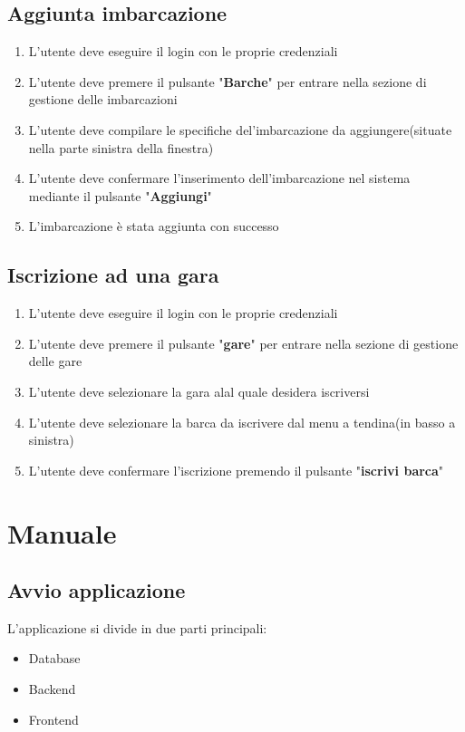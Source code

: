 \documentclass{report}
\begin{document}
    \section{Aggiunta imbarcazione}
    \begin{enumerate}
      \item L'utente deve eseguire il login con le proprie credenziali
      \item L'utente deve premere il pulsante "\textbf{Barche}" per entrare nella sezione di gestione delle imbarcazioni
      \item L'utente deve compilare le specifiche del'imbarcazione da aggiungere(situate nella parte sinistra della finestra)
      \item L'utente deve confermare l'inserimento dell'imbarcazione nel sistema mediante il pulsante "\textbf{Aggiungi}"
      \item L'imbarcazione è stata aggiunta con successo
    \end{enumerate}

    \section{Iscrizione ad una gara}
    \begin{enumerate}
      \item L'utente deve eseguire il login con le proprie credenziali
      \item L'utente deve premere il pulsante "\textbf{gare}" per entrare nella sezione di gestione delle gare
      \item L'utente deve selezionare la gara alal quale desidera iscriversi
      \item L'utente deve selezionare la barca da iscrivere dal menu a tendina(in basso a sinistra)
      \item L'utente deve confermare l'iscrizione premendo il pulsante "\textbf{iscrivi barca}"
    \end{enumerate}
    


    \chapter{Manuale} %
    \label{cha:Manuale}

    \section{Avvio applicazione}
    L'applicazione si divide in due parti principali:
  \begin{itemize}
    \item Database
    \item Backend
    \item Frontend
  \end{itemize}
\end{document}
